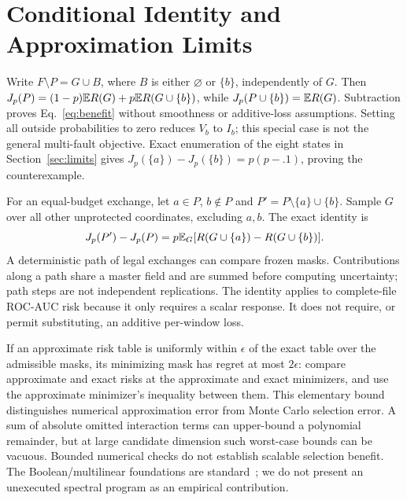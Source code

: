 \section{Conditional Identity and Approximation Limits}
\label{app:proof}
Write $F\setminus P=G\cup B$, where $B$ is either $\varnothing$ or $\{b\}$,
independently of $G$. Then
$J_p(P)=(1-p)\mathbb{E} R(G)+p\mathbb{E} R(G\cup\{b\})$, while
$J_p(P\cup\{b\})=\mathbb{E} R(G)$. Subtraction proves Eq.~\eqref{eq:benefit} without
smoothness or additive-loss assumptions. Setting all outside probabilities to
zero reduces $V_b$ to $I_b$; this special case is not the general multi-fault
objective. Exact enumeration of the eight states in Section~\ref{sec:limits}
gives $J_p(\{a\})-J_p(\{b\})=p(p-.1)$, proving the counterexample.

For an equal-budget exchange, let $a\in P$, $b\notin P$ and
$P'=P\setminus\{a\}\cup\{b\}$. Sample $G$ over all other unprotected coordinates,
excluding $a,b$. The exact identity is
\begin{equation}
J_p(P')-J_p(P)=p\mathbb{E}_G[R(G\cup\{a\})-R(G\cup\{b\})].
\end{equation}
A deterministic path of legal exchanges can compare frozen masks. Contributions
along a path share a master field and are summed before computing uncertainty;
path steps are not independent replications. The identity applies to complete-file
ROC-AUC risk because it only requires a scalar response. It does not require, or
permit substituting, an additive per-window loss.

If an approximate risk table is uniformly within $\epsilon$ of the exact table
over the admissible masks, its minimizing mask has regret at most $2\epsilon$:
compare approximate and exact risks at the approximate and exact minimizers,
and use the approximate minimizer's inequality between them. This elementary
bound distinguishes numerical approximation error from Monte Carlo selection
error. A sum of absolute omitted interaction terms can upper-bound a polynomial
remainder, but at large candidate dimension such worst-case bounds can be
vacuous. Bounded numerical checks do not establish scalable selection benefit.
The Boolean/multilinear foundations are standard~\cite{odonnell2014analysis};
we do not present an unexecuted spectral program as an empirical contribution.

